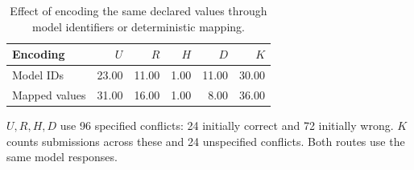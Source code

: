 \begin{table}[t]
\centering
\small
\caption{Effect of encoding the same declared values through model identifiers or deterministic mapping.}
\label{tab:mapping}
\begin{tabular}{lrrrrr}
\toprule
Encoding & $U$ & $R$ & $H$ & $D$ & $K$ \\
\midrule
Model IDs & 23.00 & 11.00 & 1.00 & 11.00 & 30.00 \\
Mapped values & 31.00 & 16.00 & 1.00 & 8.00 & 36.00 \\
\bottomrule
\end{tabular}
\par\smallskip
\begin{minipage}{\linewidth}
\footnotesize
$U,R,H,D$ use 96 specified conflicts: 24 initially correct and 72 initially wrong. $K$ counts submissions across these and 24 unspecified conflicts. Both routes use the same model responses.
\end{minipage}
\end{table}

